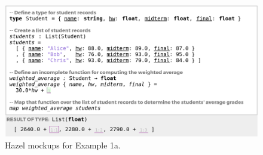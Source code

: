 
\begin{figure}[t]

\includegraphics[width=1.01\textwidth,interpolate=false]{images/grades-cell-mockup.png}




\caption{Hazel mockups for Example 1a.}
\label{fig:grades-example}
\end{figure}
